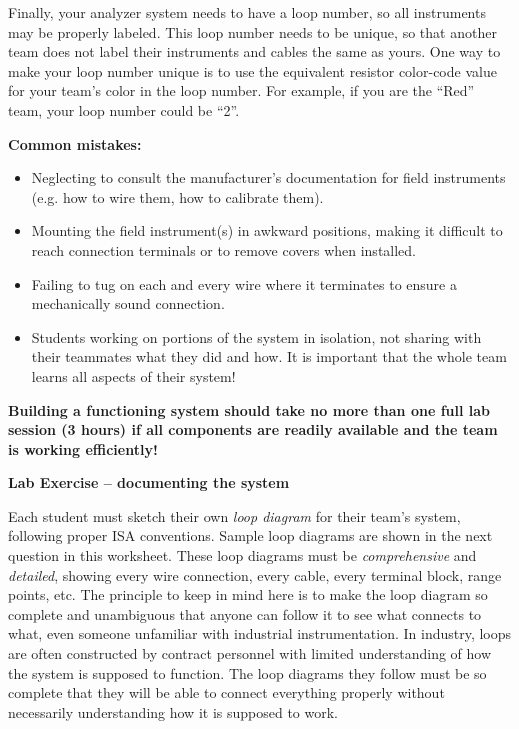 Finally, your analyzer system needs to have a loop number, so all instruments may be properly labeled.  This loop number needs to be unique, so that another team does not label their instruments and cables the same as yours.  One way to make your loop number unique is to use the equivalent resistor color-code value for your team's color in the loop number.  For example, if you are the ``Red'' team, your loop number could be ``2''. 

\vskip 10pt

{\bf Common mistakes:}

\begin{itemize}
\item{} Neglecting to consult the manufacturer's documentation for field instruments (e.g. how to wire them, how to calibrate them).
\item{} Mounting the field instrument(s) in awkward positions, making it difficult to reach connection terminals or to remove covers when installed.
\item{} Failing to tug on each and every wire where it terminates to ensure a mechanically sound connection.
\item{} Students working on portions of the system in isolation, not sharing with their teammates what they did and how.  It is important that the whole team learns all aspects of their system!
\end{itemize}

\vskip 10pt

{\bf Building a functioning system should take no more than one full lab session (3 hours) if all components are readily available and the team is working efficiently!}





\vfil \eject

\noindent
{\bf Lab Exercise -- documenting the system}

\vskip 5pt

Each student must sketch their own {\it loop diagram} for their team's system, following proper ISA conventions.  Sample loop diagrams are shown in the next question in this worksheet.  These loop diagrams must be {\it comprehensive} and {\it detailed}, showing every wire connection, every cable, every terminal block, range points, etc.  The principle to keep in mind here is to make the loop diagram so complete and unambiguous that anyone can follow it to see what connects to what, even someone unfamiliar with industrial instrumentation.  In industry, loops are often constructed by contract personnel with limited understanding of how the system is supposed to function.  The loop diagrams they follow must be so complete that they will be able to connect everything properly without necessarily understanding how it is supposed to work.

